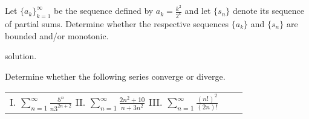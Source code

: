 \documentclass[handout]{ximera}
\begin{document}
\begin{problem}
Let $\{a_k\}_{k=1}^\infty$ be the sequence defined by $a_k = \frac{k^2}{2^k}$ and let $\{s_n\}$ denote its sequence of partial sums. Determine whether the respective sequences $\{a_k\}$ and $\{s_n\}$ are bounded and/or monotonic.
\end{problem}

\begin{freeResponse}
solution.
\end{freeResponse}

\begin{problem}
Determine whether the following series converge or diverge.
\begin{center}
\begin{tabular}{lll}
I. $\sum_{n=1}^\infty \frac{5^n}{n 3^{2n+2}}$ \hspace{.3in} II. $\sum_{n=1}^\infty \frac{2n^2+10}{n+3n^2}$ \hspace{.3in} III. $\sum_{n=1}^\infty \frac{(n!)^2}{(2n)!}$
\end{tabular}
\end{center}
\end{problem}
\end{document}
